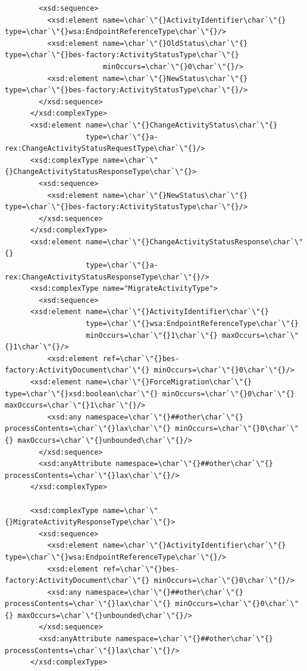 \documentclass{article}                            %
\begin{document}
\begin{footnotesize}
\begin{verbatim}
        <xsd:sequence>
          <xsd:element name=\char`\"{}ActivityIdentifier\char`\"{} type=\char`\"{}wsa:EndpointReferenceType\char`\"{}/>
          <xsd:element name=\char`\"{}OldStatus\char`\"{} type=\char`\"{}bes-factory:ActivityStatusType\char`\"{}
                       minOccurs=\char`\"{}0\char`\"{}/>
          <xsd:element name=\char`\"{}NewStatus\char`\"{} type=\char`\"{}bes-factory:ActivityStatusType\char`\"{}/>
        </xsd:sequence>
      </xsd:complexType>
      <xsd:element name=\char`\"{}ChangeActivityStatus\char`\"{}
                   type=\char`\"{}a-rex:ChangeActivityStatusRequestType\char`\"{}/>
      <xsd:complexType name=\char`\"{}ChangeActivityStatusResponseType\char`\"{}>
        <xsd:sequence>
          <xsd:element name=\char`\"{}NewStatus\char`\"{} type=\char`\"{}bes-factory:ActivityStatusType\char`\"{}/>
        </xsd:sequence>
      </xsd:complexType>
      <xsd:element name=\char`\"{}ChangeActivityStatusResponse\char`\"{}
                   type=\char`\"{}a-rex:ChangeActivityStatusResponseType\char`\"{}/>
      <xsd:complexType name="MigrateActivityType">
        <xsd:sequence>
	  <xsd:element name=\char`\"{}ActivityIdentifier\char`\"{} 
	  	           type=\char`\"{}wsa:EndpointReferenceType\char`\"{} 
	  	           minOccurs=\char`\"{}1\char`\"{} maxOccurs=\char`\"{}1\char`\"{}/>
          <xsd:element ref=\char`\"{}bes-factory:ActivityDocument\char`\"{} minOccurs=\char`\"{}0\char`\"{}/>
	  <xsd:element name=\char`\"{}ForceMigration\char`\"{} type=\char`\"{}xsd:boolean\char`\"{} minOccurs=\char`\"{}0\char`\"{} maxOccurs=\char`\"{}1\char`\"{}/>    
          <xsd:any namespace=\char`\"{}##other\char`\"{} processContents=\char`\"{}lax\char`\"{} minOccurs=\char`\"{}0\char`\"{} maxOccurs=\char`\"{}unbounded\char`\"{}/>        
        </xsd:sequence>
        <xsd:anyAttribute namespace=\char`\"{}##other\char`\"{} processContents=\char`\"{}lax\char`\"{}/>
      </xsd:complexType>

      <xsd:complexType name=\char`\"{}MigrateActivityResponseType\char`\"{}>
        <xsd:sequence>
          <xsd:element name=\char`\"{}ActivityIdentifier\char`\"{} type=\char`\"{}wsa:EndpointReferenceType\char`\"{}/>
          <xsd:element ref=\char`\"{}bes-factory:ActivityDocument\char`\"{} minOccurs=\char`\"{}0\char`\"{}/>
          <xsd:any namespace=\char`\"{}##other\char`\"{} processContents=\char`\"{}lax\char`\"{} minOccurs=\char`\"{}0\char`\"{} maxOccurs=\char`\"{}unbounded\char`\"{}/>        
        </xsd:sequence>
        <xsd:anyAttribute namespace=\char`\"{}##other\char`\"{} processContents=\char`\"{}lax\char`\"{}/>
      </xsd:complexType>


\end{verbatim}
\end{footnotesize}
\end{document}
